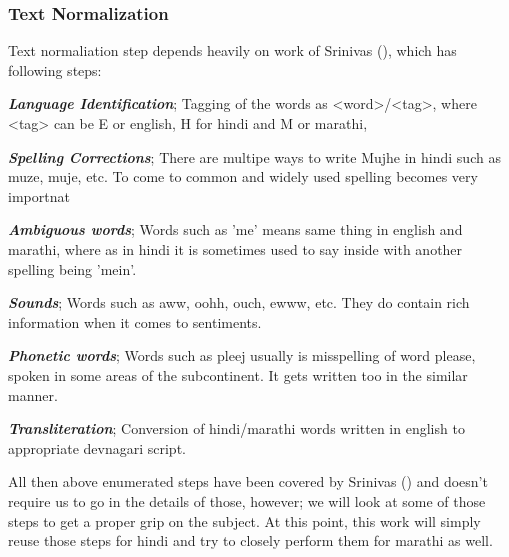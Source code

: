 \documentclass[12pt]{article}
\begin{document}
\subsubsection{Text Normalization}
\fontsize{12}{20}\selectfont Text normaliation step depends heavily on work of Srinivas
(\cite{sharma_text_2015}), which has following steps:
\begin{itemize*}
  \item \textbf{\textit{Language Identification}}; Tagging of the words as
      <word>/<tag>, where <tag> can be E or english, H for hindi and M or
      marathi,\\
  \item \textbf{\textit{Spelling Corrections}}; There are multipe ways to write
      Mujhe in hindi such as muze, muje, etc. To come to common and widely used
      spelling becomes very importnat\\
  \item \textbf{\textit{Ambiguous words}}; Words such as 'me' means same thing
      in english and marathi, where as in hindi it is sometimes used to say
      inside with another spelling being 'mein'. \\
  \item \textbf{\textit{Sounds}}; Words such as aww, oohh, ouch, ewww, etc.
      They do contain rich information when it comes to sentiments.\\
  \item \textbf{\textit{Phonetic words}}; Words such as pleej usually is
      misspelling of word please, spoken in some areas of the subcontinent. It
      gets written too in the similar manner.\\
  \item \textbf{\textit{Transliteration}}; Conversion of hindi/marathi words
      written in english to appropriate devnagari script.\\
\end{itemize*}

\fontsize{12}{20}\selectfont All then above enumerated steps have been covered by Srinivas
(\cite{sharma_text_2015}) and doesn't require us to go in the details of those,
however; we will look at some of those steps to get a proper grip on the
subject. At this point, this work will simply reuse those steps for hindi and try to
closely perform them for marathi as well. \\
\end{document}
